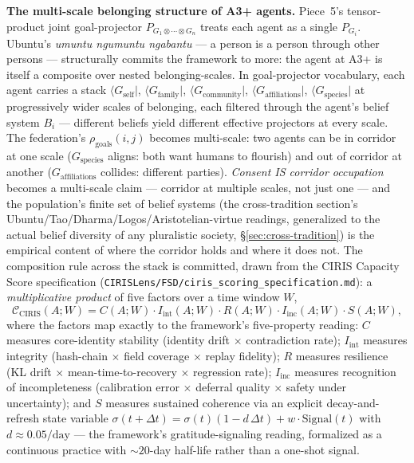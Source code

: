 \documentclass[11pt,a4paper]{article}
\begin{document}
\textbf{The multi-scale belonging structure of A3+ agents.} Piece~5's tensor-product joint goal-projector $P_{G_1 \otimes \cdots \otimes G_n}$ treats each agent as a single $P_{G_i}$. Ubuntu's \emph{umuntu ngumuntu ngabantu} --- a person is a person through other persons --- structurally commits the framework to more: the agent at A3+ is itself a composite over nested belonging-scales. In goal-projector vocabulary, each agent carries a stack $\langle G_{\text{self}}|$, $\langle G_{\text{family}}|$, $\langle G_{\text{community}}|$, $\langle G_{\text{affiliations}}|$, $\langle G_{\text{species}}|$ at progressively wider scales of belonging, each filtered through the agent's belief system $B_i$ --- different beliefs yield different effective projectors at every scale. The federation's $\rho_{\text{goals}}(i,j)$ becomes multi-scale: two agents can be in corridor at one scale ($G_{\text{species}}$ aligns: both want humans to flourish) and out of corridor at another ($G_{\text{affiliations}}$ collides: different parties). \emph{Consent IS corridor occupation} becomes a multi-scale claim --- corridor at multiple scales, not just one --- and the population's finite set of belief systems (the cross-tradition section's Ubuntu/Tao/Dharma/Logos/Aristotelian-virtue readings, generalized to the actual belief diversity of any pluralistic society, \S\ref{sec:cross-tradition}) is the empirical content of where the corridor holds and where it does not. The composition rule across the stack is committed, drawn from the CIRIS Capacity Score specification (\texttt{CIRISLens/FSD/ciris\_scoring\_specification.md}): a \emph{multiplicative product} of five factors over a time window $W$,
\[
\mathcal{C}_{\text{CIRIS}}(A;W) = C(A;W) \cdot I_{\text{int}}(A;W) \cdot R(A;W) \cdot I_{\text{inc}}(A;W) \cdot S(A;W),
\]
where the factors map exactly to the framework's five-property reading: $C$ measures core-identity stability (identity drift $\times$ contradiction rate); $I_{\text{int}}$ measures integrity (hash-chain $\times$ field coverage $\times$ replay fidelity); $R$ measures resilience (KL drift $\times$ mean-time-to-recovery $\times$ regression rate); $I_{\text{inc}}$ measures recognition of incompleteness (calibration error $\times$ deferral quality $\times$ safety under uncertainty); and $S$ measures sustained coherence via an explicit decay-and-refresh state variable $\sigma(t + \Delta t) = \sigma(t)(1 - d\,\Delta t) + w \cdot \mathrm{Signal}(t)$ with $d \approx 0.05/\mathrm{day}$ --- the framework's gratitude-signaling reading, formalized as a continuous practice with $\sim 20$-day half-life rather than a one-shot signal.
\end{document}

